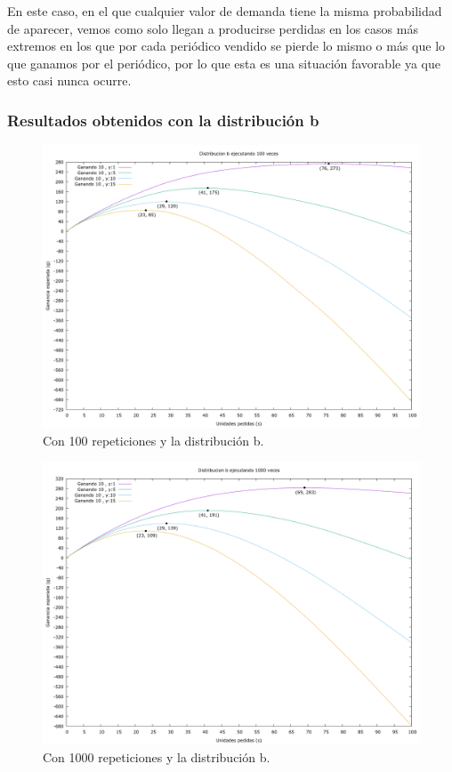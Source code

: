 \documentclass[12pt, spanish]{article}
\begin{document}
En este caso, en el que cualquier valor de demanda tiene la misma probabilidad de aparecer, vemos como solo llegan a producirse perdidas en los casos más extremos en los que por cada periódico vendido se pierde lo mismo o más que lo que ganamos por el periódico, por lo que esta es una situación favorable ya que esto casi nunca ocurre.


\subsubsection{Resultados obtenidos con la distribución b}


\begin{figure}[H]
	\centering
	\includegraphics[scale = 0.3]{prob_b/datos_b_100.png}
	\caption{Con 100 repeticiones y la distribución b.}
	\label{fig:ej1_a_100}

\end{figure}

\begin{figure}[H]
	\centering
	\includegraphics[scale = 0.3]{prob_b/datos_b_1000.png}
	\caption{Con 1000 repeticiones y la distribución b.}
	\label{fig:ej1_a_1000}

\end{figure}
\end{document}
